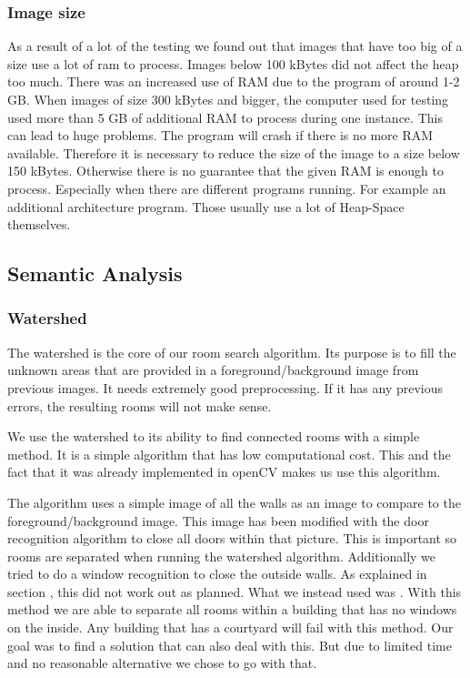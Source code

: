 \subsubsection{Image size}
As a result of a lot of the testing we found out that images that have too big of a size use a lot of ram to process. Images below 100 kBytes did not affect the heap too much. There was an increased use of RAM due to the program of around 1-2 GB. When images of size 300 kBytes and bigger, the computer used for testing used more than 5 GB of additional RAM to process during one instance. This can lead to huge problems. The program will crash if there is no more RAM available. Therefore it is necessary to reduce the size of the image to a size below 150 kBytes. Otherwise there is no guarantee that the given RAM is enough to process. Especially when there are different programs running. For example an additional architecture program. Those usually use a lot of Heap-Space themselves. 

\subsection{Semantic Analysis}
\subsubsection{Watershed}
The watershed is the core of our room search algorithm. Its purpose is to fill  the unknown areas that are provided in a foreground/background image from previous images. It needs extremely good preprocessing. If it has any previous errors, the resulting rooms will not make sense.

We use the watershed to its ability to find connected rooms with a simple method. It is a simple algorithm that has low computational cost. This and the fact that it was already implemented in openCV makes us use this algorithm.

The algorithm uses a simple image of all the walls as an image to compare to the foreground/background image. This image has been modified with the door recognition algorithm to close all doors within that picture. This is important so rooms are separated when running the watershed algorithm. Additionally we tried to do a window recognition to close the outside walls. As explained in section , this did not work out as planned. What we instead used was . With this method we are able to separate all rooms within a building that has no windows on the inside. Any building that has a courtyard will fail with this method. Our goal was to find a solution that can also deal with this. But due to limited time and no reasonable alternative we chose to go with that.

